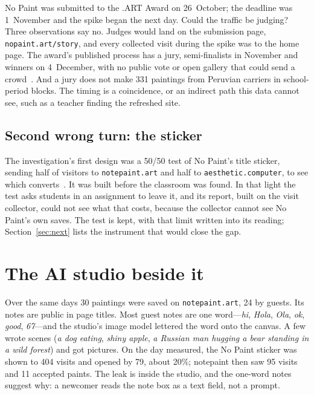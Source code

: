 \documentclass[10pt,letterpaper,twocolumn]{article}
\begin{document}
No Paint was submitted to the .ART Award on 26~October; the deadline was
1~November and the spike began the next day. Could the traffic be
judging? Three observations say no. Judges would land on the submission
page, \texttt{nopaint.art/story}, and every collected visit during the
spike was to the home page. The award's published process has a jury,
semi-finalists in November and winners on 4~December, with no public
vote or open gallery that could send a crowd~\citep{dotart2026award}.
And a jury does not make 331 paintings from Peruvian carriers in
school-period blocks. The timing is a coincidence, or an indirect path
this data cannot see, such as a teacher finding the refreshed site.

\subsection{Second wrong turn: the sticker}

The investigation's first design was a 50/50 test of No Paint's title
sticker, sending half of visitors to \texttt{notepaint.art} and half to
\texttt{aesthetic.computer}, to see which converts~\citep{kohavi2020trustworthy}. It was built before
the classroom was found. In that light the test asks students in an
assignment to leave it, and its report, built on the visit collector,
could not see what that costs, because the collector cannot see No
Paint's own saves. The test is kept, with that limit written into its
reading; Section~\ref{sec:next} lists the instrument that would close
the gap.

\section{The AI studio beside it}

Over the same days 30 paintings were saved on \texttt{notepaint.art},
24 by guests. Its notes are public in page titles. Most guest notes are
one word---\emph{hi}, \emph{Hola}, \emph{Ola}, \emph{ok}, \emph{good}, \emph{67}---and
the studio's image model lettered the word onto the canvas. A few wrote
scenes (\emph{a dog eating}, \emph{shiny apple}, \emph{a Russian man
hugging a bear standing in a wild forest}) and got pictures. On the day
measured, the No Paint sticker was shown to 404 visits and opened by 79,
about 20\%; notepaint then saw 95 visits and 11 accepted paints. The
leak is inside the studio, and the one-word notes suggest why: a
newcomer reads the note box as a text field, not a prompt.
\end{document}
